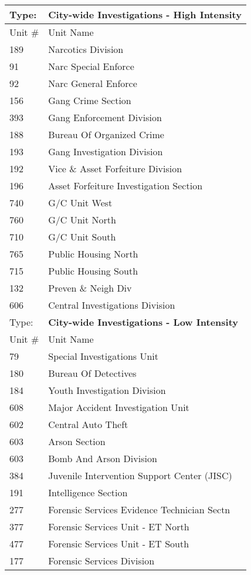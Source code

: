 \begin{table}
\tiny
\centering
\caption{}\label{tab:citywide}
\begin{tabular}{|ll|}
\hline
Type:	&\textbf{City-wide Investigations - High Intensity}\\ 
\hline
Unit \#	&Unit Name \\
\hline
189	&Narcotics Division\\
91	&Narc Special Enforce\\
92	&Narc General Enforce\\
156	&Gang Crime Section\\
393	&Gang Enforcement Division\\
188	&Bureau Of Organized Crime\\
193	&Gang Investigation Division\\
192	&Vice \& Asset Forfeiture Division\\
196	&Asset Forfeiture Investigation Section \\
740	&G/C Unit West\\
760	&G/C Unit North\\
710	&G/C Unit South\\
765	&Public Housing North\\
715	&Public Housing South\\
132	&Preven \& Neigh Div\\
606	&Central Investigations Division\\
\hline
Type:	&\textbf{City-wide Investigations - Low Intensity}\\
\hline
Unit \#	&Unit Name \\
\hline
79	&Special Investigations Unit\\
180	&Bureau Of  Detectives\\
184	&Youth Investigation Division\\
608	&Major Accident Investigation Unit\\
602	&Central Auto Theft\\
603	&Arson Section\\
603	&Bomb And Arson Division\\
384	&Juvenile Intervention Support Center (JISC)\\
191	&Intelligence Section\\
277	&Forensic Services Evidence Technician Sectn\\
377	&Forensic Services Unit - ET North\\
477	&Forensic Services Unit - ET South\\
177	&Forensic Services Division\\
\hline
\end{tabular}
\end{table}

